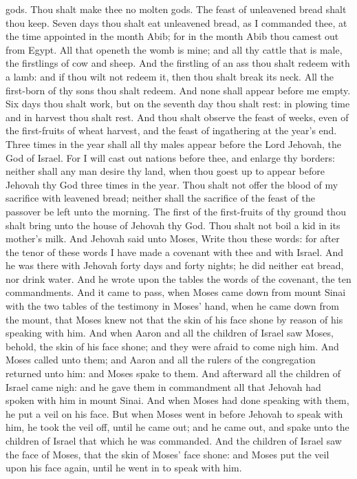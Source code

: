 gods. Thou shalt make thee no molten gods.  The feast of unleavened bread shalt thou keep. Seven days thou shalt eat unleavened bread, as I commanded thee, at the time appointed in the month Abib; for in the month Abib thou camest out from Egypt. All that openeth the womb is mine; and all thy cattle that is male, the firstlings of cow and sheep. And the firstling of an ass thou shalt redeem with a lamb: and if thou wilt not redeem it, then thou shalt break its neck. All the first-born of thy sons thou shalt redeem. And none shall appear before me empty.  Six days thou shalt work, but on the seventh day thou shalt rest: in plowing time and in harvest thou shalt rest. And thou shalt observe the feast of weeks, even of the first-fruits of wheat harvest, and the feast of ingathering at the year’s end. Three times in the year shall all thy males appear before the Lord Jehovah, the God of Israel. For I will cast out nations before thee, and enlarge thy borders: neither shall any man desire thy land, when thou goest up to appear before Jehovah thy God three times in the year.  Thou shalt not offer the blood of my sacrifice with leavened bread; neither shall the sacrifice of the feast of the passover be left unto the morning. The first of the first-fruits of thy ground thou shalt bring unto the house of Jehovah thy God. Thou shalt not boil a kid in its mother’s milk.  And Jehovah said unto Moses, Write thou these words: for after the tenor of these words I have made a covenant with thee and with Israel. And he was there with Jehovah forty days and forty nights; he did neither eat bread, nor drink water. And he wrote upon the tables the words of the covenant, the ten commandments.  And it came to pass, when Moses came down from mount Sinai with the two tables of the testimony in Moses’ hand, when he came down from the mount, that Moses knew not that the skin of his face shone by reason of his speaking with him. And when Aaron and all the children of Israel saw Moses, behold, the skin of his face shone; and they were afraid to come nigh him. And Moses called unto them; and Aaron and all the rulers of the congregation returned unto him: and Moses spake to them. And afterward all the children of Israel came nigh: and he gave them in commandment all that Jehovah had spoken with him in mount Sinai. And when Moses had done speaking with them, he put a veil on his face. But when Moses went in before Jehovah to speak with him, he took the veil off, until he came out; and he came out, and spake unto the children of Israel that which he was commanded. And the children of Israel saw the face of Moses, that the skin of Moses’ face shone: and Moses put the veil upon his face again, until he went in to speak with him. 

